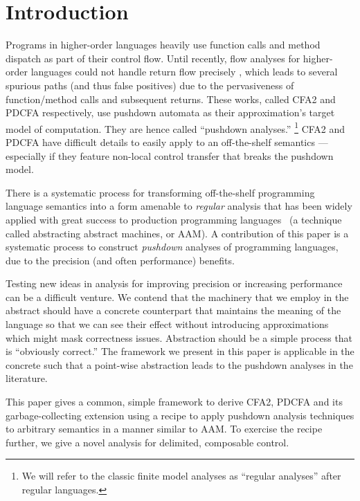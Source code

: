 
\section{Introduction}

Programs in higher-order languages heavily use function calls and method dispatch as part of their control flow.
%
Until recently, flow analyses for higher-order languages could not handle return flow precisely \citep{ianjohnson:vardoulakis-lmcs11, dvanhorn:Earl2010Pushdown}, which leads to several spurious paths (and thus false positives) due to the pervasiveness of function/method calls and subsequent returns.
%
These works, called CFA2 and PDCFA respectively, use pushdown automata as their approximation's target model of computation.
%
They are hence called ``pushdown analyses.''
%
\footnote{We will refer to the classic finite model analyses as ``regular analyses'' after regular languages.}
%
CFA2 and PDCFA have difficult details to easily apply to an off-the-shelf semantics --- especially if they feature non-local control transfer that breaks the pushdown model.

There is a systematic process for transforming off-the-shelf programming language semantics into a form amenable to \emph{regular} analysis that has been widely applied with great success to production programming languages~\citet{dvanhorn:VanHorn2010Abstracting} (a technique called abstracting abstract machines, or AAM).
%
A contribution of this paper is a systematic process to construct \emph{pushdown} analyses of programming languages, due to the precision (and often performance) benefits.
%


Testing new ideas in analysis for improving precision or increasing performance can be a difficult venture.
%
We contend that the machinery that we employ in the abstract should have a concrete counterpart that maintains the meaning of the language so that we can see their effect without introducing approximations which might mask correctness issues.
%
Abstraction should be a simple process that is ``obviously correct.''
%
The framework we present in this paper is applicable in the concrete such that a point-wise abstraction leads to the pushdown analyses in the literature.

This paper gives a common, simple framework to derive CFA2, PDCFA and its garbage-collecting extension using a recipe to apply pushdown analysis techniques to arbitrary semantics in a manner similar to AAM.
%
To exercise the recipe further, we give a novel analysis for delimited, composable control. \\

